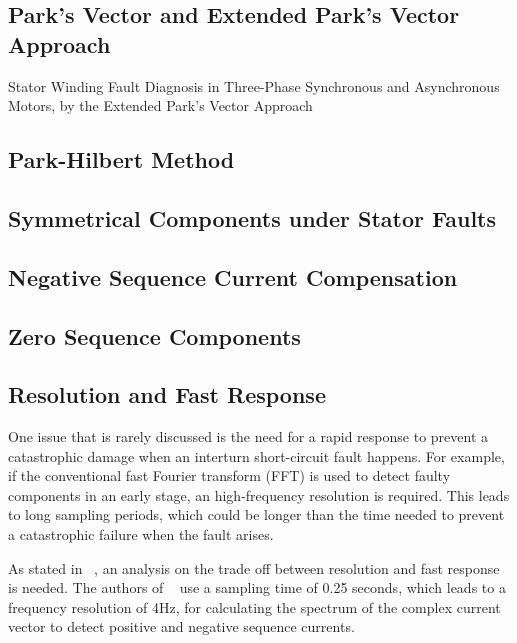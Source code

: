 \subsection{Park's Vector and Extended Park's Vector Approach} %
\label{subsec:epva}

Stator Winding Fault Diagnosis in Three-Phase Synchronous and Asynchronous Motors, by the Extended Park’s Vector Approach


\subsection{Park-Hilbert Method} %
\label{subsec:park_hilbert_method}

\subsection{Symmetrical Components under Stator Faults} %
\label{subsec:symmetrical_components}

\subsection{Negative Sequence Current Compensation} %
\label{subsec:negative_sequence_current_compensation}

\subsection{Zero Sequence Components} %
\label{subsec:zero_sequence_components}

\subsection{Resolution and Fast Response} %
\label{subsec:resolution_fast_response}

One issue that is rarely discussed is the need for a rapid response to prevent a catastrophic damage when an interturn short-circuit fault happens. For example, if the conventional fast Fourier transform (FFT) is used to detect faulty components in an early stage, an high-frequency resolution is required. This leads to long sampling periods, which could be longer than the time needed to prevent a catastrophic failure when the fault arises. 

As stated in ~\cite{Cheng2011}, an analysis on the trade off between resolution and fast response is needed. The authors of ~\cite{Cheng2011} use a sampling time of 0.25 seconds, which leads to a frequency resolution of 4Hz, for calculating the spectrum of the complex current vector to detect positive and negative sequence currents.

